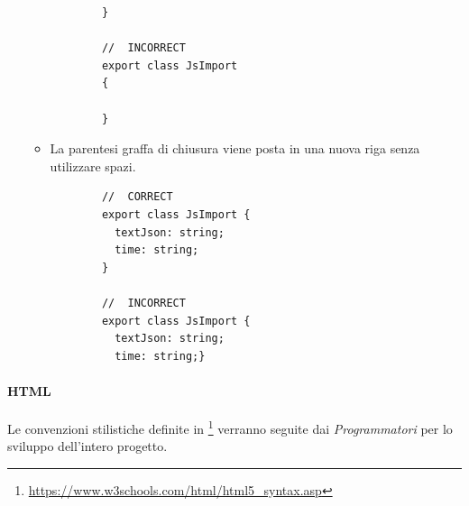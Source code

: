 \begin{itemize}
\begin{itemize}
\begin{lstlisting}
		}
		
		//  INCORRECT
		export class JsImport 
		{  
		
		}
		\end{lstlisting} 
		
		\item{La parentesi graffa di chiusura viene posta in una nuova riga senza utilizzare spazi.}
		\begin{lstlisting}
		//  CORRECT
		export class JsImport {  
		  textJson: string;
		  time: string;
		}
		
		//  INCORRECT
		export class JsImport {  
		  textJson: string;
		  time: string;}
		\end{lstlisting}
		\end{itemize}	
\end{itemize}

\paragraph{HTML}\Spazio
Le convenzioni stilistiche definite in \footnote{\url{https://www.w3schools.com/html/html5_syntax.asp}} verranno seguite dai \emph{Programmatori} per lo sviluppo dell'intero progetto.

